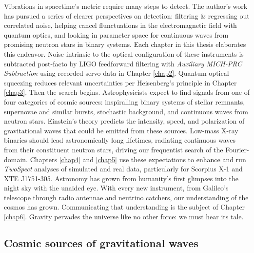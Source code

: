 Vibrations in spacetime's metric require many steps to detect.
The author's work has pursued a series of clearer perspectives on detection: filtering \& regressing out correlated noise, helping cancel flunctuations in the electromagnetic field with quantum optics, and looking in parameter space for continuous waves from promising neutron stars in binary systems. 
Each chapter in this thesis elaborates this endeavor.
Noise intrinsic to the optical configuration of these instruments is subtracted post-facto by LIGO feedforward filtering with \textit{Auxiliary MICH-PRC Subtraction} using recorded servo data in Chapter \ref{chap2}. 
Quantum optical squeezing reduces relevant uncertainties per Heisenberg's principle in Chapter \ref{chap3}.
Then the search begins.
Astrophysicists expect to find signals from one of four categories of cosmic sources: inspiralling binary systems of stellar remnants, supernovae and similar bursts, stochastic background, and continuous waves from neutron stars.
Einstein's theory predicts the intensity, speed, and polarization of gravitational waves that could be emitted from these sources.
Low-mass X-ray binaries should lead astronomically long lifetimes, radiating continuous waves from their constituent neutron stars, driving our frequentist search of the Fourier-domain.
Chapters \ref{chap4} and \ref{chap5} use these expectations to enhance and run \textit{TwoSpect} analyses of simulated and real data, particularly for Scorpius X-1 and XTE J1751-305.
Astronomy has grown from humanity's first glimpses into the night sky with the unaided eye. 
With every new instrument, from Galileo's telescope through radio antennae and neutrino catchers, our understanding of the cosmos has grown. 
Communicating that understanding is the subject of Chapter \ref{chap6}.
Gravity pervades the universe like no other force: we must hear its tale. 

        
        \subsection{Cosmic sources of gravitational waves}
        \label{cosmic_sources}
      

